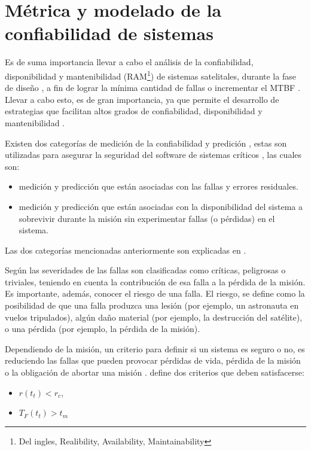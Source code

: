 \section{Métrica y modelado de la confiabilidad de sistemas}\label{sec:metrica_modelado}
Es de suma importancia llevar a cabo el análisis de la confiabilidad, disponibilidad y mantenibilidad (RAM\footnote{Del ingles, Realibility, Availability, Maintainability}) de sistemas satelitales, durante la fase de diseño \citep{Hoque15}, a fin de lograr la mínima cantidad de fallas o incrementar el \ac{MTBF} \citep{Peng13}. Llevar a cabo esto, es de gran importancia, ya que permite el desarrollo de estrategias que facilitan altos grados de confiabilidad, disponibilidad y mantenibilidad \citep{Hoque15}.

Existen dos categorías de medición de la confiabilidad y predición \citep{Schneidewind97}, estas son utilizadas para asegurar la seguridad del software de sistemas críticos \citep{Schneidewind97}, las cuales son:
  \begin{itemize}
    \item medición y predicción que están asociadas con las fallas y errores residuales.
    \item medición y predicción que están asociadas con la disponibilidad del sistema a sobrevivir durante la misión sin experimentar fallas
      (o pérdidas) en el sistema.
  \end{itemize}

  Las dos categorías mencionadas anteriormente son explicadas en \cite{Schneidewind97}.

  Según \cite{Liu14} las severidades de las fallas son clasificadas como críticas, peligrosas o triviales, teniendo en cuenta la contribución de esa falla a la pérdida de la misión. Es importante, además, conocer el riesgo de una falla. El riesgo, se define como la posibilidad de que una falla produzca una lesión (por ejemplo, un astronauta en vuelos tripulados), algún daño material (por ejemplo, la destrucción del satélite), o una pérdida (por ejemplo, la pérdida de la misión).

  Dependiendo de la misión, un criterio para definir si un sistema es seguro o no, es reduciendo las fallas que pueden provocar pérdidas de vida, pérdida de la misión o la obligación de abortar una misión \citep{Schneidewind97}. \cite{Schneidewind97} define dos criterios que deben satisfacerse:
  \begin{itemize}
    \item $r(t_t) < r_c$,
    \item $T_F(t_t) > t_m$
  \end{itemize}

